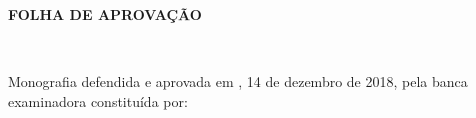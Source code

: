 \documentclass[
	12pt,				%
	openright,			%
	twoside,			%
	a4paper,			%
	english,			%
	french,				%
	spanish,			%
	brazil				%
	]{abntex2}
\begin{document}

%
% 
%
\begin{folhadeaprovacao}
  \begin{center}
    {\ABNTEXchapterfont\large\imprimirinstituicao}

    \vspace*{\fill}\vspace*{\fill}
    \begin{center}
    {\par \Large \centering \textbf{FOLHA DE APROVAÇÃO}}
      \newline
     \\ \ABNTEXchapterfont\bfseries\Large\imprimirtitulo
    \end{center}
    \vspace*{\fill}
    
    \imprimirautor
    \vspace*{\fill}\vspace*{\fill}
    
    \hspace{.45\textwidth}
    \begin{minipage}{.5\textwidth}
        \imprimirpreambulo
    \end{minipage}
    \vspace*{\fill}
   \end{center}
        
   Monografia defendida e aprovada em \imprimirlocal,  14 de dezembro de 2018, pela banca examinadora constituída por:

      
   \begin{center}
    \vspace*{0.5cm}
    {\large\imprimirlocal}
    \par
    {\large\imprimirdata}
    \vspace*{1cm}
  \end{center}
  
\end{folhadeaprovacao}
\end{document}
